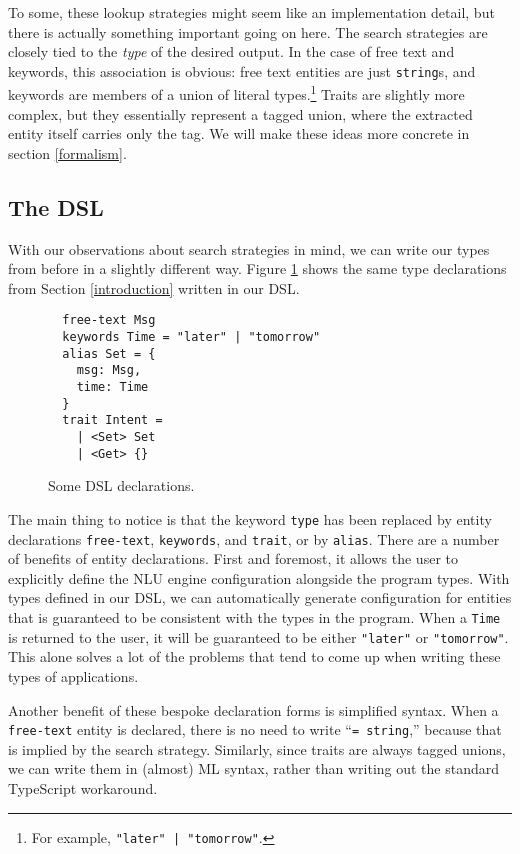 \documentclass[twocolumn]{article}
\newcommand{\ts}[1]{\texttt{#1}}
\begin{document}
To some, these lookup strategies might seem like an implementation detail, but
there is actually something important going on here. The search strategies are
closely tied to the \emph{type} of the desired output. In the case of free text
and keywords, this association is obvious: free text entities are just
\ts{string}s, and keywords are members of a union of literal
types.\footnote{For example, \texttt{"later" | "tomorrow"}.} Traits are slightly
more complex, but they essentially represent a tagged union, where the extracted
entity itself carries only the tag. We will make these ideas more concrete in
section \ref{formalism}.

\subsection{The DSL}
With our observations about search strategies in mind, we can write our types
from before in a slightly different way. Figure \ref{fig:dsl_decls} shows the
same type declarations from Section \ref{introduction} written in our DSL.

\begin{figure}
\begin{verbatim}
  free-text Msg
  keywords Time = "later" | "tomorrow"
  alias Set = {
    msg: Msg,
    time: Time
  }
  trait Intent =
    | <Set> Set
    | <Get> {}
\end{verbatim}
  \caption{Some DSL declarations.}
  \label{fig:dsl_decls}
\end{figure}

The main thing to notice is that the keyword \ts{type} has been replaced by
entity declarations \ts{free-text}, \ts{keywords}, and \ts{trait}, or by
\ts{alias}. There are a number of benefits of entity declarations. First and
foremost, it allows the user to explicitly define the NLU engine configuration
alongside the program types. With types defined in our DSL, we can automatically
generate configuration for entities that is guaranteed to be consistent with the
types in the program. When a \ts{Time} is returned to the user, it will be
guaranteed to be either \ts{"later"} or \ts{"tomorrow"}. This alone solves a lot
of the problems that tend to come up when writing these types of applications.

Another benefit of these bespoke declaration forms is simplified syntax. When a
\ts{free-text} entity is declared, there is no need to write ``\ts{= string},''
because that is implied by the search strategy. Similarly, since traits are
always tagged unions, we can write them in (almost) ML syntax, rather than
writing out the standard TypeScript workaround.
\end{document}
